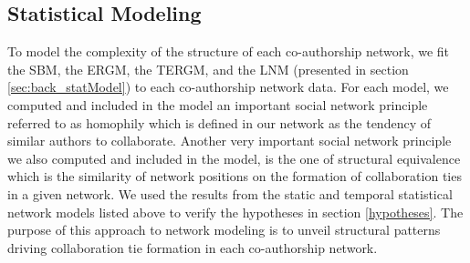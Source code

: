 \subsection{Statistical Modeling}
To model the complexity of the structure of each co-authorship network, we fit the SBM, the ERGM, the TERGM, and the LNM (presented in section \ref{sec:back_statModel}) to each co-authorship network data. 
For each model, we computed and included in the model an important social network principle referred to as homophily which is defined in our network as the tendency of similar authors to collaborate. Another very important social network principle we also computed and included in the model, is the one of structural equivalence which is the similarity of network positions on the formation of collaboration ties in a given network. 
We used the results from the static and temporal statistical network models listed above to verify the hypotheses in section \ref{hypotheses}. The purpose of this approach to network modeling is to unveil structural patterns driving collaboration tie formation in each co-authorship network.

